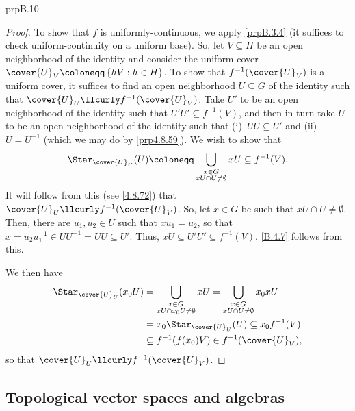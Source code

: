 \begin{prp}{}{prpB.10}
\begin{proof}
To show that $f$ is uniformly-continuous, we apply \cref{prpB.3.4} (it suffices to check uniform-continuity on a uniform base).  So, let $V\subseteq H$ be an open neighborhood of the identity and consider the uniform cover $\cover{U}_V\coloneqq \left\{ hV:h\in H\right\}$.  To show that $f^{-1}(\cover{U}_V)$ is a uniform cover, it suffices to find an open neighborhood $U\subseteq G$ of the identity such that $\cover{U}_U\llcurly f^{-1}(\cover{U}_V)$.  Take $U'$ to be an open neighborhood of the identity such that $U'U'\subseteq f^{-1}(V)$, and then in turn take $U$ to be an open neighborhood of the identity such that (i)~$UU\subseteq U'$ and (ii)~$U=U^{-1}$ (which we may do by \cref{prp4.8.59}).  We wish to show that
\begin{equation}\label{B.4.7}
\Star _{\cover{U}_U}(U)\coloneqq \bigcup _{\substack{x\in G \\ xU\cap U\neq \emptyset}}xU\subseteq f^{-1}(V).
\end{equation}
It will follow from this (see \eqref{4.8.72}) that $\cover{U}_U\llcurly f^{-1}(\cover{U}_V)$.  So, let $x\in G$ be such that $xU\cap U\neq \emptyset$.  Then, there are $u_1,u_2\in U$ such that $xu_1=u_2$, so that $x=u_2u_1^{-1}\in UU^{-1}=UU\subseteq U'$.  Thus, $xU\subseteq U'U'\subseteq f^{-1}(V)$.  \eqref{B.4.7} follows from this.

We then have
\begin{equation}\label{4.8.72}
\begin{split}
\Star _{\cover{U}_U}(x_0U) & =\bigcup _{\substack{x\in G \\ xU\cap x_0U\neq \emptyset}}xU=\bigcup _{\substack{x\in G \\ xU\cap U\neq \emptyset}}x_0xU \\
& =x_0\Star _{\cover{U}_U}(U)\subseteq x_0f^{-1}(V) \\
& \subseteq f^{-1}(f(x_0)V)\in f^{-1}(\cover{U}_V),
\end{split}
\end{equation}
so that $\cover{U}_U\llcurly f^{-1}(\cover{U}_V)$.
\end{proof}
\end{prp}

\subsection{Topological vector spaces and algebras}

